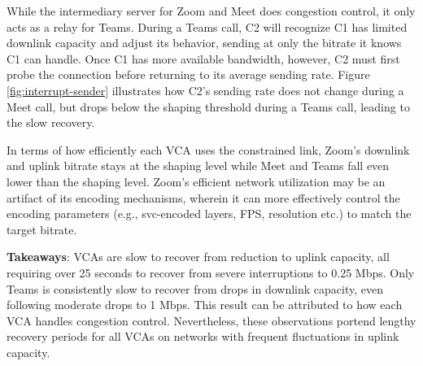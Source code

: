 While the intermediary server for Zoom and Meet does congestion control, it only acts as a relay for Teams. During a Teams call, C2 will recognize C1 has limited downlink capacity and adjust its behavior, sending at only the bitrate it knows C1 can handle. Once C1 has more available bandwidth, however, C2 must first probe the connection before returning to its average sending rate. Figure \ref{fig:interrupt-sender} illustrates how C2's sending rate does not change during a Meet call, but drops below the shaping threshold during a Teams call, leading to the slow recovery.


In terms of how efficiently each VCA uses the constrained link, Zoom's downlink and uplink bitrate stays at the shaping level while Meet and Teams fall even lower than the shaping level. Zoom's efficient network utilization may be an artifact of its encoding mechanisms, wherein it can more effectively control the encoding parameters (e.g., svc-encoded layers, FPS, resolution etc.) to match the target bitrate.  

\noindent \textbf{Takeaways}: VCAs are slow to recover from reduction to uplink capacity, all requiring over 25 seconds to recover from severe interruptions to 0.25 Mbps. Only Teams is consistently slow to recover from drops in downlink capacity, even following moderate drops to 1 Mbps. This result can be attributed to how each VCA handles congestion control. Nevertheless, these observations portend lengthy recovery periods for all VCAs on networks with frequent fluctuations in uplink capacity. 





